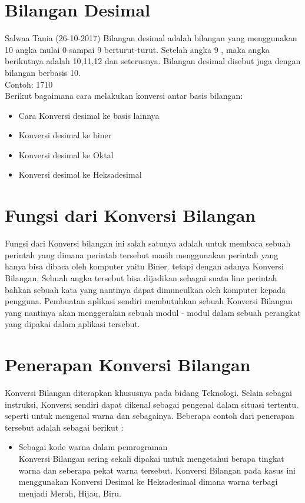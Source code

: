 \section{Bilangan Desimal} Salwaa Tania (26-10-2017)
Bilangan desimal adalah bilangan yang menggunakan 10 angka mulai 0 sampai 9 berturut-turut. Setelah angka 9 , maka angka berikutnya adalah 10,11,12 dan seterusnya. Bilangan desimal disebut juga dengan bilangan berbasis 10.
\\Contoh: 1710
\\Berikut bagaimana cara melakukan konversi antar basis bilangan: 
\begin{itemize}
	\item Cara Konversi desimal ke basis lainnya
	\item Konversi desimal ke biner
	\item Konversi desimal ke Oktal
	\item Konversi desimal ke Heksadesimal
\end{itemize}

\section{Fungsi dari Konversi Bilangan} %
Fungsi dari Konversi bilangan ini salah satunya adalah untuk membaca sebuah perintah yang dimana perintah tersebut masih menggunakan perintah yang hanya bisa dibaca oleh komputer yaitu Biner. tetapi dengan adanya Konversi Bilangan, Sebuah angka tersebut bisa dijadikan sebagai suatu line perintah bahkan sebuah kata yang nantinya dapat dimunculkan oleh komputer kepada pengguna. Pembuatan aplikasi sendiri membutuhkan sebuah Konversi Bilangan yang nantinya akan menggerakan sebuah modul - modul dalam sebuah perangkat yang dipakai dalam aplikasi tersebut. 

\section{Penerapan Konversi Bilangan} %
Konversi Bilangan diterapkan khususnya pada bidang Teknologi. Selain sebagai instruksi, Konversi sendiri dapat dikenal sebagai pengenal dalam situasi tertentu. seperti untuk mengenal warna dan sebagainya. Beberapa contoh dari penerapan tersebut adalah sebagai berikut : 
\begin{itemize}
	\item Sebagai kode warna dalam pemrograman \\ Konversi Bilangan sering sekali dipakai untuk mengetahui berapa tingkat warna dan seberapa pekat warna tersebut. Konversi Bilangan pada kasus ini menggunakan Konversi Desimal ke Heksadesimal dimana warna terbagi menjadi Merah, Hijau, Biru. 
\end{itemize}

